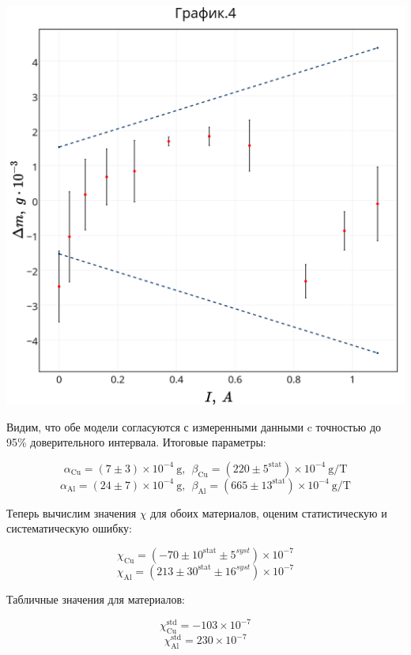 \includegraphics[scale = 0.19]{my_plot4.png} 
\newpage

Видим, что обе модели согласуются с измеренными данными c точностью до 95\% доверительного интервала. Итоговые параметры:

$$ \alpha_{\text{Cu}} = (7 \pm 3) \times 10^{-4}~\text{g},~~\beta_{\text{Cu}} = (220 \pm 5^{\text{stat}}) \times 10^{-4}~\text{g/T}$$
$$ \alpha_{\text{Al}} = (24 \pm 7) \times 10^{-4}~\text{g},~~\beta_{\text{Al}} = (665 \pm 13^{\text{stat}}) \times 10^{-4}~\text{g/T}$$

Теперь вычислим значения $\chi$ для обоих материалов, оценим статистическую и систематическую ошибку:

$$\chi_{\text{Cu}} = (-70 \pm 10^{\text{stat}} \pm 5^{syst}) \times 10^{-7}$$
$$\chi_{\text{Al}} = (213 \pm 30^{\text{stat}} \pm 16^{syst}) \times 10^{-7}$$


Табличные значения для материалов:

$$\chi^{\text{std}}_{\text{Cu}} = -103 \times 10^{-7}$$
$$\chi^{\text{std}}_{\text{Al}} = 230 \times 10^{-7}$$




